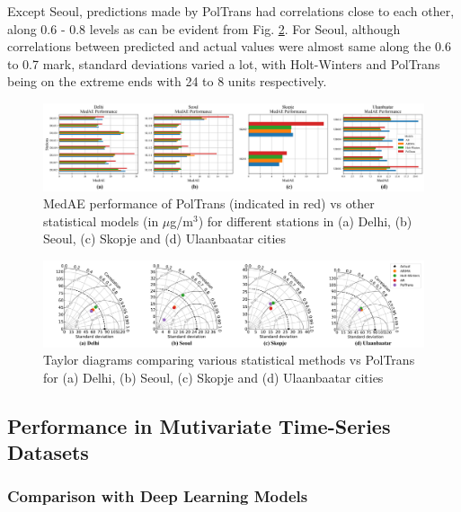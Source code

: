 \documentclass[10pt,journal]{IEEEtran}
\begin{document}
Except Seoul, predictions made by {PolTrans}  had correlations close to each other, along 0.6 - 0.8 levels as can be evident from Fig. \ref{fig:stat-taylor}. For Seoul, although correlations between predicted and actual values were almost same along the 0.6 to 0.7 mark, standard deviations varied a lot, with Holt-Winters and {PolTrans}  being on the extreme ends with 24 to 8 units respectively. 

\begin{figure}[h]
\centering
\includegraphics[scale=0.365]{../paper_figures/stat_medae.png}
\caption{MedAE performance of {PolTrans} (indicated in red) vs other statistical models (in $\mu$g/m$^{3}$) for different stations in (a) Delhi, (b) Seoul, (c) Skopje and (d) Ulaanbaatar cities}
\label{fig:stat-medae}
\end{figure}

\begin{figure}[h]
\centering
\includegraphics[width=18cm]{../paper_figures/merged_taylor_stat.png}
\caption{Taylor diagrams comparing various statistical methods vs {PolTrans}  for (a) Delhi, (b) Seoul, (c) Skopje and (d) Ulaanbaatar cities}
\label{fig:stat-taylor}
\end{figure}

\subsection{Performance in Mutivariate Time-Series Datasets}

\subsubsection{Comparison with Deep Learning Models}
\end{document}
